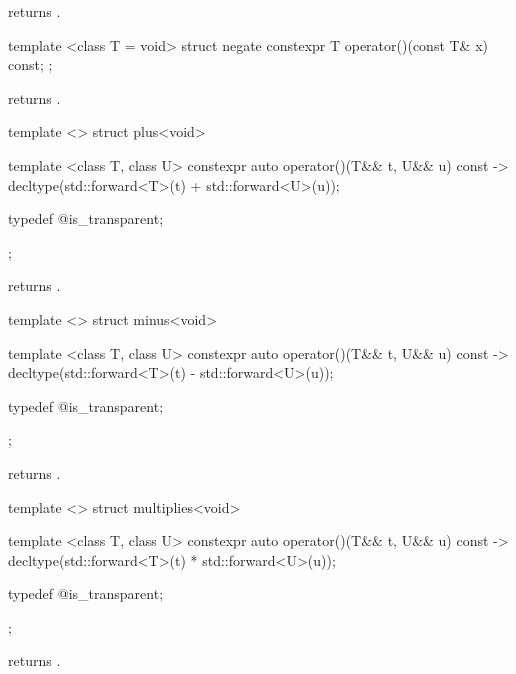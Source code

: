 \begin{itemdescr}
\pnum
{} returns .
\end{itemdescr}

%
\begin{itemdecl}
template <class T = void> struct negate {
  constexpr T operator()(const T& x) const;
};
\end{itemdecl}

\begin{itemdescr}
\pnum
{} returns .
\end{itemdescr}

%
\begin{itemdecl}
template <> struct plus<void> {
  template <class T, class U> constexpr auto operator()(T&& t, U&& u) const
    -> decltype(std::forward<T>(t) + std::forward<U>(u));

  typedef @\unspec@ is_transparent;
};
\end{itemdecl}

\begin{itemdescr}
\pnum
{} returns .
\end{itemdescr}

%
\begin{itemdecl}
template <> struct minus<void> {
  template <class T, class U> constexpr auto operator()(T&& t, U&& u) const
    -> decltype(std::forward<T>(t) - std::forward<U>(u));

  typedef @\unspec@ is_transparent;
};
\end{itemdecl}

\begin{itemdescr}
\pnum
{} returns .
\end{itemdescr}

%
\begin{itemdecl}
template <> struct multiplies<void> {
  template <class T, class U> constexpr auto operator()(T&& t, U&& u) const
    -> decltype(std::forward<T>(t) * std::forward<U>(u));

  typedef @\unspec@ is_transparent;
};
\end{itemdecl}

\begin{itemdescr}
\pnum
{} returns .
\end{itemdescr}

